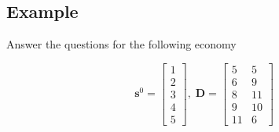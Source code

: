 \documentclass[11pt]{article}
\begin{document}
\subsection{Example}

Answer the questions for the following economy

\[
\boldsymbol{s}^0 = 
\begin{bmatrix}
    1 \\ 
    2 \\ 
    3 \\ 
    4 \\
    5  
\end{bmatrix}, \; \boldsymbol{D} = 
\begin{bmatrix}
    5 & 5 \\ 
    6 & 9 \\ 
    8 & 11 \\ 
    9 & 10 \\ 
    11 & 6 
\end{bmatrix}
\]
\end{document}
